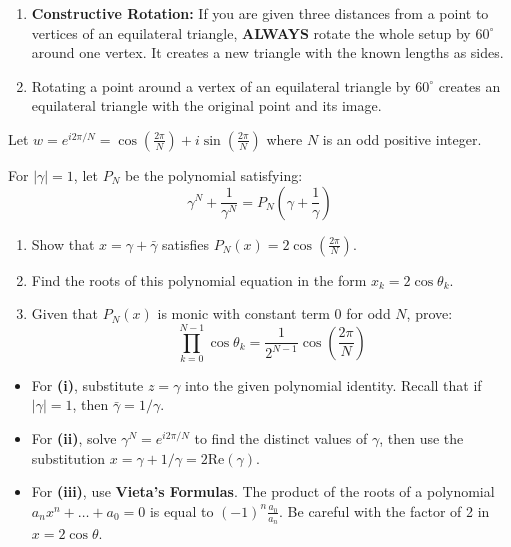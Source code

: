 \begin{takeaways}
\begin{enumerate}
    \item \textbf{Constructive Rotation:} 
    If you are given three distances from a point to vertices of an equilateral triangle, 
    \textbf{ALWAYS} rotate the whole setup by $60^\circ$ around one vertex. 
    It creates a new triangle with the known lengths as sides.
    \item Rotating a point around a vertex of an equilateral triangle by 
    $60^\circ$ creates an equilateral triangle with the original point and its image.
    
\end{enumerate}


\end{takeaways}

\begin{problem}
Let $w = e^{i 2\pi/N} = \cos\left(\frac{2\pi}{N}\right) + i \sin\left(\frac{2\pi}{N}\right) $ 
where $N$ is an odd positive integer.

For $|\gamma|=1$, let $P_N$ be the polynomial satisfying:
\[ \gamma^N + \frac{1}{\gamma^N} = P_N\left(\gamma + \frac{1}{\gamma}\right) \]

\begin{enumerate}
    \item[(i)] Show that $x = \gamma + \bar{\gamma}$ satisfies $P_N(x) = 2\cos\left(\frac{2\pi}{N}\right)$.
    \item[(ii)] Find the roots of this polynomial equation in the form $x_k = 2\cos\theta_k$.
    \item[(iii)] Given that $P_N(x)$ is monic with constant term 0 for odd $N$, prove:
    \[ \prod_{k=0}^{N-1} \cos\theta_k = \frac{1}{2^{N-1}} \cos\left(\frac{2\pi}{N}\right) \]
\end{enumerate}
\end{problem}

\begin{hint}
\begin{itemize}
    \item For \textbf{(i)}, substitute $z = \gamma$ into the given polynomial identity. Recall that if $|\gamma|=1$, then $\bar{\gamma} = 1/\gamma$.
    \item For \textbf{(ii)}, solve $\gamma^N = e^{i 2\pi/N}$ to find the distinct values of $\gamma$, then use the substitution $x = \gamma + 1/\gamma = 2\text{Re}(\gamma)$.
    \item For \textbf{(iii)}, use \textbf{Vieta's Formulas}. The product of the roots of a polynomial $a_n x^n + \dots + a_0 = 0$ is equal to $(-1)^n \frac{a_0}{a_n}$. Be careful with the factor of 2 in $x = 2\cos\theta$.
\end{itemize}
\end{hint}

